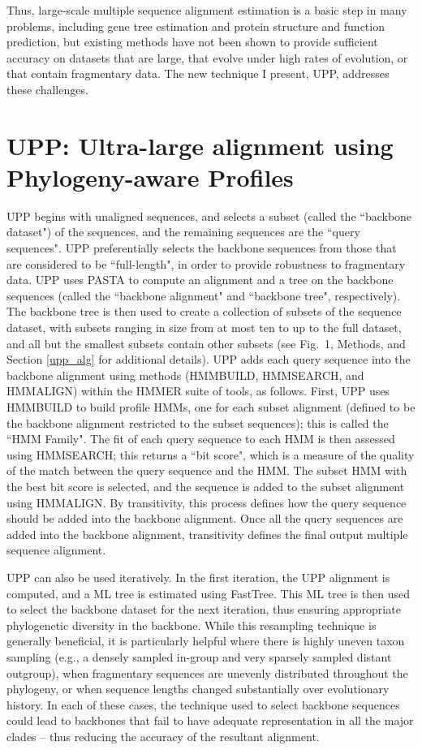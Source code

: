 Thus, large-scale multiple sequence alignment estimation is
a basic step in many problems, including gene tree estimation and
protein structure and function prediction, but
existing methods have not been shown to provide sufficient accuracy
on datasets that are large, that evolve under high rates of evolution,
or that contain fragmentary data. 
The new technique I present, UPP, addresses these challenges.

\section{UPP: Ultra-large alignment using Phylogeny-aware Profiles}\label{upp:algorithm}
UPP begins with unaligned sequences, and selects a subset
(called the ``backbone dataset") of the sequences,
and the remaining sequences are the ``query sequences".
UPP preferentially selects the backbone
sequences from  those that are considered to be ``full-length", in order to
provide robustness to fragmentary data.
UPP uses PASTA to compute an alignment and a tree on the backbone sequences
(called the ``backbone alignment" and ``backbone tree", respectively).
The backbone tree is then used to create a collection of subsets of the sequence dataset,
with subsets ranging in size from at most ten to up to the full dataset,
and all but the smallest subsets contain other subsets
(see Fig.~1, Methods, and Section \ref{upp_alg} for additional details).
UPP adds each
query sequence into the backbone alignment
using methods (HMMBUILD, HMMSEARCH,
and HMMALIGN) within the HMMER  suite of
tools, as follows. First, UPP uses HMMBUILD to build profile HMMs, one
for each subset alignment (defined to be the backbone
alignment restricted to the subset sequences); this is
called the ``HMM Family".
The fit of each query sequence
to each HMM is then assessed using HMMSEARCH; this 
returns a ``bit score", which is
a measure of the quality of the match between
the query sequence and the HMM. 
The subset HMM with the best bit score is selected, and the 
sequence is added to the subset alignment using HMMALIGN.
By transitivity, this process defines how the query sequence should
be added into the backbone
alignment. Once all the query sequences are added
into the backbone alignment, transitivity defines the final
output multiple sequence alignment. 

UPP can also be used iteratively. In the
first iteration, the UPP alignment is computed,
and a ML tree is estimated using
FastTree.
This ML tree is then used to select the backbone dataset
for the next iteration, thus ensuring
appropriate phylogenetic diversity in the backbone.
While this resampling technique is generally beneficial,
it is particularly helpful
where there is highly uneven taxon sampling (e.g., a densely sampled
in-group and very sparsely sampled distant outgroup), 
when %
 fragmentary sequences are unevenly distributed throughout the
phylogeny, or when sequence lengths changed substantially
over evolutionary history.
In each of these cases, 
the technique used to select backbone sequences could
lead to backbones that fail to have
adequate representation in all the major clades -- thus reducing
the accuracy of the resultant alignment.

